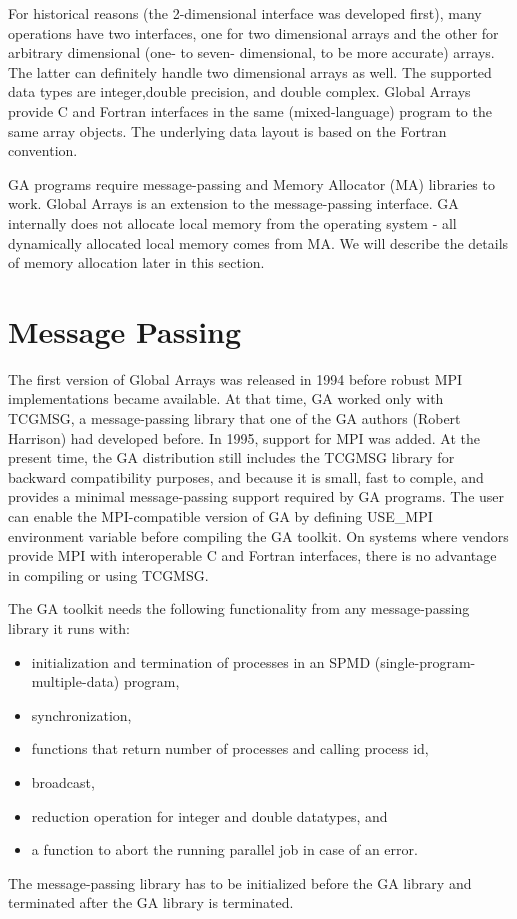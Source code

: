 For historical reasons (the 2-dimensional interface was developed
first), many operations have two interfaces, one for two dimensional
arrays and the other for arbitrary dimensional (one- to seven- dimensional,
to be more accurate) arrays. The latter can definitely handle two
dimensional arrays as well. The supported data types are integer,double
precision, and double complex. Global Arrays provide C and Fortran
interfaces in the same (mixed-language) program to the same array
objects. The underlying data layout is based on the Fortran convention.

GA programs require message-passing and Memory Allocator (MA) libraries
to work. Global Arrays is an extension to the message-passing interface.
GA internally does not allocate local memory from the operating system
- all dynamically allocated local memory comes from MA. We will describe
the details of memory allocation later in this section. 


\section{Message Passing }

The first version of Global Arrays was released in 1994 before robust
MPI implementations became available. At that time, GA worked only
with TCGMSG, a message-passing library that one of the GA authors
(Robert Harrison) had developed before. In 1995, support for MPI was
added. At the present time, the GA distribution still includes the
TCGMSG library for backward compatibility purposes, and because it
is small, fast to comple, and provides a minimal message-passing support
required by GA programs. The user can enable the MPI-compatible version
of GA by defining USE\_MPI environment variable before compiling the
GA toolkit. On systems where vendors provide MPI with interoperable
C and Fortran interfaces, there is no advantage in compiling or using
TCGMSG.

The GA toolkit needs the following functionality from any message-passing
library it runs with:
\begin{itemize}
\item initialization and termination of processes in an SPMD (single-program-multiple-data)
program, 
\item synchronization, 
\item functions that return number of processes and calling process id, 
\item broadcast, 
\item reduction operation for integer and double datatypes, and 
\item a function to abort the running parallel job in case of an error.
\end{itemize}
The message-passing library has to be initialized before the GA library
and terminated after the GA library is terminated.

